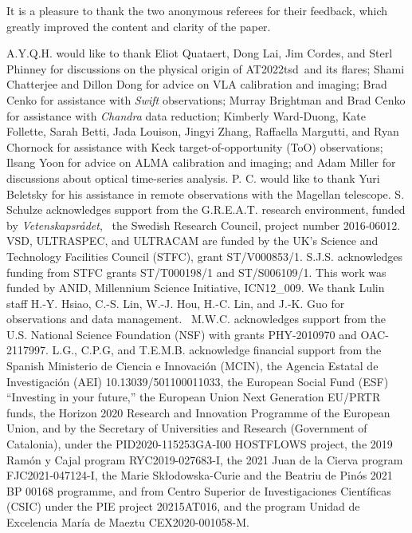 \documentclass{nature_plusfigure}
\newcommand{\at}{AT2022tsd}
\begin{document}
\begin{addendum}

\item It is a pleasure to thank the two anonymous referees for their feedback, which greatly improved the content and clarity of the paper.

A.Y.Q.H. would like to thank Eliot Quataert, Dong Lai, Jim Cordes, and Sterl Phinney for discussions on the physical origin of \at\ and its flares; Shami Chatterjee and Dillon Dong for advice on VLA calibration and imaging; Brad Cenko for assistance with {\it Swift} observations; Murray Brightman and Brad Cenko for assistance with {\it Chandra} data reduction; Kimberly Ward-Duong, Kate Follette, Sarah Betti, Jada Louison, Jingyi Zhang, Raffaella Margutti, and Ryan Chornock for assistance with Keck target-of-opportunity (ToO) observations; Ilsang Yoon for advice on ALMA calibration and imaging; and Adam Miller for discussions about optical time-series analysis.
P. C. would like to thank Yuri Beletsky for his assistance in remote observations with the Magellan telescope.
S. Schulze acknowledges support from the G.R.E.A.T. research environment, funded by {\em Vetenskapsr\aa det},  the Swedish Research Council, project number 2016-06012.
VSD, ULTRASPEC, and ULTRACAM are funded by the UK’s Science and Technology Facilities Council (STFC), grant ST/V000853/1.
S.J.S. acknowledges funding from STFC grants ST/T000198/1 and ST/S006109/1.
This work was funded by ANID, Millennium Science Initiative, ICN12\_009.
We thank Lulin staff H.-Y. Hsiao, C.-S. Lin, W.-J. Hou, H.-C. Lin, and J.-K. Guo for observations and data management. 
M.W.C. acknowledges support from the U.S. National Science Foundation (NSF) with grants PHY-2010970 and OAC-2117997.
L.G., C.P.G, and T.E.M.B. acknowledge financial support from the Spanish Ministerio de Ciencia e Innovaci\'on (MCIN), the Agencia Estatal de Investigaci\'on (AEI) 10.13039/501100011033, the European Social Fund (ESF) ``Investing in your future,” the European Union Next Generation EU/PRTR funds, the Horizon 2020 Research and Innovation Programme of the European Union, and by the Secretary of Universities and Research (Government of Catalonia), under the PID2020-115253GA-I00 HOSTFLOWS project, the 2019 Ram\'on y Cajal program RYC2019-027683-I, the 2021 Juan de la Cierva program FJC2021-047124-I, the Marie Skłodowska-Curie and the Beatriu de Pin\'os 2021 BP 00168 programme, and from Centro Superior de Investigaciones Cient\'ificas (CSIC) under the PIE project 20215AT016, and the program Unidad de Excelencia Mar\'ia de Maeztu CEX2020-001058-M.

\end{addendum}
\end{document}
